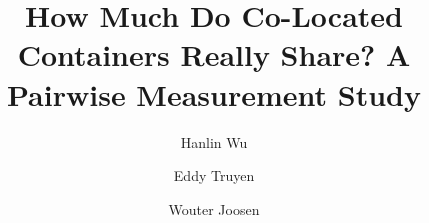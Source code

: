 \documentclass[sigplan,10pt,natbib=false]{acmart}
\begin{document}
\title{How Much Do Co-Located Containers Really Share? A Pairwise
  Measurement Study}
\renewcommand{\shorttitle}{How Much Do Co-Located Containers Really Share?}

\author{Hanlin Wu}

\author{Eddy Truyen}

\author{Wouter Joosen}

\renewcommand{\shortauthors}{Wu, Truyen, and Joosen}
\end{document}

